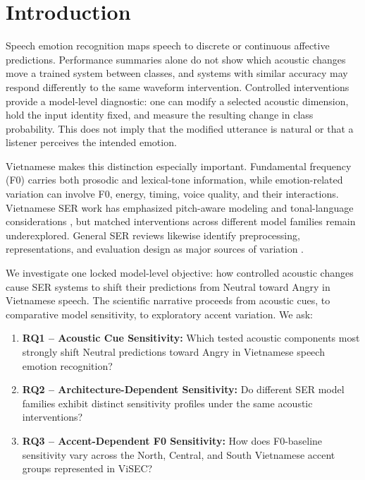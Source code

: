 \documentclass[a4paper,runningheads]{llncs}
\begin{document}
\section{Introduction}

Speech emotion recognition maps speech to discrete or continuous affective predictions. Performance summaries alone do not show which acoustic changes move a trained system between classes, and systems with similar accuracy may respond differently to the same waveform intervention. Controlled interventions provide a model-level diagnostic: one can modify a selected acoustic dimension, hold the input identity fixed, and measure the resulting change in class probability. This does not imply that the modified utterance is natural or that a listener perceives the intended emotion.

Vietnamese makes this distinction especially important. Fundamental frequency (F0) carries both prosodic and lexical-tone information, while emotion-related variation can involve F0, energy, timing, voice quality, and their interactions. Vietnamese SER work has emphasized pitch-aware modeling and tonal-language considerations \cite{thanh2024pitchfusion,ngo2012vietnameseprosody}, but matched interventions across different model families remain underexplored. General SER reviews likewise identify preprocessing, representations, and evaluation design as major sources of variation \cite{akcay2020ser,madanian2023ser}.

We investigate one locked model-level objective: how controlled acoustic changes cause SER systems to shift their predictions from Neutral toward Angry in Vietnamese speech. The scientific narrative proceeds from acoustic cues, to comparative model sensitivity, to exploratory accent variation. We ask:

\begin{enumerate}
    \item \textbf{RQ1 -- Acoustic Cue Sensitivity:} Which tested acoustic components most strongly shift Neutral predictions toward Angry in Vietnamese speech emotion recognition?
    \item \textbf{RQ2 -- Architecture-Dependent Sensitivity:} Do different SER model families exhibit distinct sensitivity profiles under the same acoustic interventions?
    \item \textbf{RQ3 -- Accent-Dependent F0 Sensitivity:} How does F0-baseline sensitivity vary across the North, Central, and South Vietnamese accent groups represented in ViSEC?
\end{enumerate}
\end{document}
